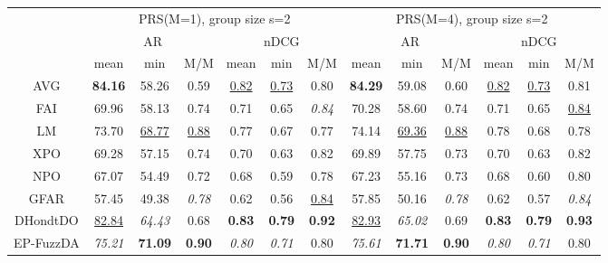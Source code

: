 \begin{tabular}{ c | c c c | c c c || c c c | c c c}

\multicolumn{1}{c}{} & \multicolumn{6}{c}{PRS(M=1), group size s=2} & \multicolumn{6}{c}{PRS(M=4), group size s=2} \\
\multicolumn{1}{c}{} & \multicolumn{3}{c}{AR} & \multicolumn{3}{c}{nDCG} & \multicolumn{3}{c}{AR} & \multicolumn{3}{c}{nDCG} \\
& mean & min & M/M & mean & min & M/M & mean & min & M/M & mean & min & M/M \\
\hline
AVG & \textbf{84.16} & 58.26 & 0.59 & \underline{0.82} & \underline{0.73} & 0.80 & \textbf{84.29} & 59.08 & 0.60 & \underline{0.82} & \underline{0.73} & 0.81 \\
FAI & 69.96 & 58.13 & 0.74 & 0.71 & 0.65 & \textit{0.84} & 70.28 & 58.60 & 0.74 & 0.71 & 0.65 & \underline{0.84} \\
LM & 73.70 & \underline{68.77} & \underline{0.88} & 0.77 & 0.67 & 0.77 & 74.14 & \underline{69.36} & \underline{0.88} & 0.78 & 0.68 & 0.78 \\
XPO & 69.28 & 57.15 & 0.74 & 0.70 & 0.63 & 0.82 & 69.89 & 57.75 & 0.73 & 0.70 & 0.63 & 0.82 \\
NPO & 67.07 & 54.49 & 0.72 & 0.68 & 0.59 & 0.78 & 67.23 & 55.16 & 0.73 & 0.68 & 0.60 & 0.80 \\
GFAR & 57.45 & 49.38 & \textit{0.78} & 0.62 & 0.56 & \underline{0.84} & 57.85 & 50.16 & \textit{0.78} & 0.62 & 0.57 & \textit{0.84} \\
DHondtDO & \underline{82.84} & \textit{64.43} & 0.68 & \textbf{0.83} & \textbf{0.79} & \textbf{0.92} & \underline{82.93} & \textit{65.02} & 0.69 & \textbf{0.83} & \textbf{0.79} & \textbf{0.93} \\
EP-FuzzDA & \textit{75.21} & \textbf{71.09} & \textbf{0.90} & \textit{0.80} & \textit{0.71} & 0.80 & \textit{75.61} & \textbf{71.71} & \textbf{0.90} & \textit{0.80} & \textit{0.71} & 0.80 \\


\end{tabular}
